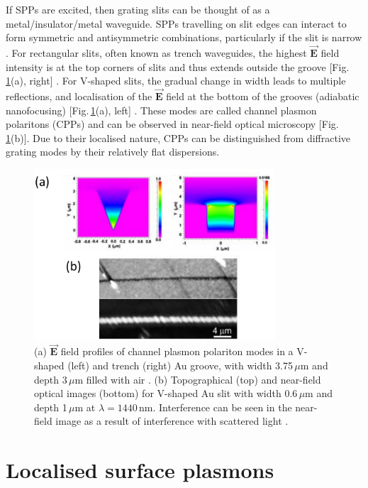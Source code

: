 If SPPs are excited, then grating slits can be thought of as a metal/insulator/metal waveguide. SPPs travelling on slit edges can interact to form symmetric and antisymmetric combinations, particularly if the slit is narrow \cite{Maier2007}. For rectangular slits, often known as trench waveguides, the highest $\vec{\mathbf{E}}$ field intensity is at the top corners of slits and thus extends outside the groove [Fig.\,\ref{3Fig6}(a), right] \cite{Bozhevolnyi2005, Srivastava2009, Chattopadhyay2012}. For V-shaped slits, the gradual change in width leads to multiple reflections, and localisation of the $\vec{\mathbf{E}}$ field at the bottom of the grooves (adiabatic nanofocusing) [Fig.\,\ref{3Fig6}(a), left] \cite{Bozhevolnyi2005, Srivastava2009, Novikov2002, Kuttge2009, Sondergaard2012}. These modes are called channel plasmon polaritons (CPPs) and can be observed in near-field optical microscopy [Fig.\,\ref{3Fig6}(b)]. Due to their localised nature, CPPs can be distinguished from diffractive grating modes by their relatively flat dispersions.
\begin{figure}[h!] 
\centering    
\includegraphics[width=0.8\textwidth]{Fig6}
\caption{(a) $\vec{\mathbf{E}}$ field profiles of channel plasmon polariton modes in a V-shaped (left) and trench (right) Au groove, with width 3.75\,$\mu$m and depth 3\,$\mu$m filled with air \cite{Srivastava2009}. (b) Topographical (top) and near-field optical images (bottom) for V-shaped Au slit with width 0.6\,$\mu$m and depth 1\,$\mu$m at $\lambda=1440$\,nm. Interference can be seen in the near-field image as a result of interference with scattered light \cite{Bozhevolnyi2005}.}
\label{3Fig6}
\end{figure} 

\section{Localised surface plasmons}
